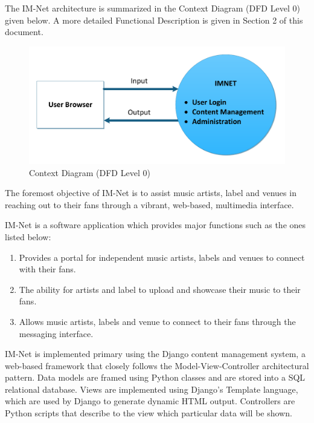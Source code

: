 \documentclass[letterpaper]{article}
\begin{document}
The IM-Net architecture is summarized in the Context Diagram (DFD Level 0) given below. A more detailed Functional Description is given in Section 2 of this document.\\

\begin{figure}[h]
\centering
\includegraphics{DFD_level_0}
\caption{Context Diagram (DFD Level 0)}
\label{fig:DFD_level_0}
\end{figure}
\eject

The foremost objective of IM-Net is to assist music artists, label and venues in reaching out to their fans through a vibrant, web-based, multimedia interface.

IM-Net is a software application which provides major functions such as the ones listed below:

\begin{enumerate}
\item  Provides a portal for independent music artists, labels and venues to connect with their fans.

\item  The ability for artists and label to upload and showcase their music to their fans.

\item  Allows music artists, labels and venue to connect to their fans through the messaging interface.
\end{enumerate}

IM-Net is implemented primary using the Django content management system, a web-based framework that closely follows the Model-View-Controller architectural pattern. Data models are framed using Python classes and are stored into a SQL relational database. Views are implemented using Django's Template language, which are used by Django to generate dynamic HTML output. Controllers are Python scripts that describe to the view which particular data will be shown. 
\end{document}
